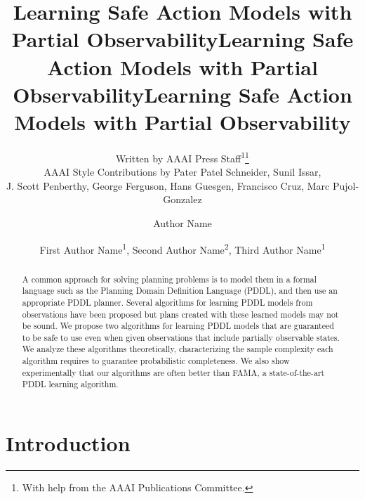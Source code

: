 \documentclass[letterpaper]{article} %
\title{Learning Safe Action Models with Partial Observability}
\author{
    Written by AAAI Press Staff\textsuperscript{\rm 1}\thanks{With help from the AAAI Publications Committee.}\\
    AAAI Style Contributions by Pater Patel Schneider,
    Sunil Issar,\\
    J. Scott Penberthy,
    George Ferguson,
    Hans Guesgen,
    Francisco Cruz\equalcontrib,
    Marc Pujol-Gonzalez\equalcontrib
}
\title{Learning Safe Action Models with Partial Observability}
\author {
    Author Name
}
\title{Learning Safe Action Models with Partial Observability}
\author {
    First Author Name\textsuperscript{\rm 1},
    Second Author Name\textsuperscript{\rm 2},
    Third Author Name\textsuperscript{\rm 1}
}
\begin{document}
\maketitle

\begin{abstract}
A common approach for solving planning problems is to model them in a formal language such as the Planning Domain Definition Language (PDDL), and then use an appropriate PDDL planner.
Several algorithms for learning PDDL models from observations have been proposed but plans created with these learned models may not be sound.
We propose two algorithms for learning PDDL models that are guaranteed to be safe to use even when given observations that include partially observable states.
We analyze these algorithms theoretically, characterizing the sample complexity each algorithm requires to guarantee probabilistic completeness.
We also show experimentally that our algorithms are often better than FAMA, a state-of-the-art PDDL learning algorithm.
\end{abstract}

















\section{Introduction}
\end{document}
